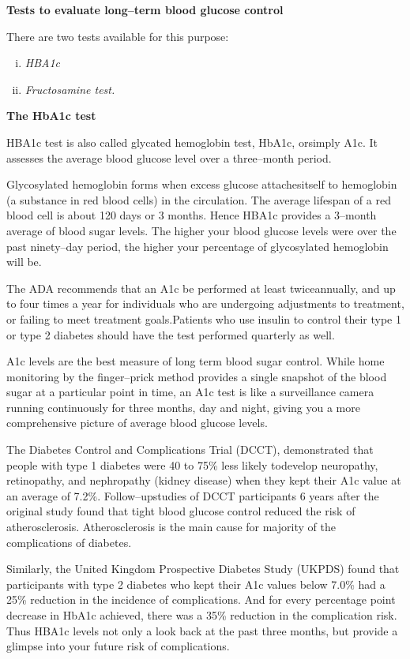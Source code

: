 \noindent\textbf{Tests to evaluate long–term blood glucose control}

\noindent There are two tests available for this purpose:
\begin{enumerate}[i.]
\itemsep=0pt
\item \textit{HBA1c}
\item \textit{Fructosamine test.}
\end{enumerate}

\noindent\textbf{The HbA1c test}

HBA1c test is also called glycated hemoglobin test, HbA1c, or\break simply A1c. It assesses the average blood glucose level over a three–month period.

Glycosylated hemoglobin forms when excess glucose attaches\break itself to hemoglobin (a substance in red blood cells) in the circulation. The average life\-span of a red blood cell is about 120 days or 3 months. Hence HBA1c provides a 3–month average of blood sugar levels. The higher your blood glucose levels were over the past ninety–day period, the higher your percentage of glycosylated hemoglobin will be.

The ADA recommends that an A1c be performed at least twice\break annually, and up to four times a year for individuals who are under\-going adjustments to treatment, or failing to meet treatment goals.\break Patients who use insulin to control their type 1 or type 2 diabetes should have the test performed quarterly as well.

A1c levels are the best measure of long term blood sugar control. While home monitoring by the finger–prick method provides a single snapshot of the blood sugar at a particular point in time, an A1c test is like a surveillance camera running continuously for three months, day and night, giving you a more comprehensive picture of average blood glucose levels.

The Diabetes Control and Complications Trial (DCCT), demonstra\-ted that people with type 1 diabetes were 40 to 75\% less likely to\break develop neuropathy, retinopathy, and nephropathy (kidney di\-sease) when they kept their A1c value at an average of 7.2\%. Follow–up\break studies of DCCT participants 6 years after the original study found that tight blood glucose control reduced the risk of atherosclerosis. Athero\-sclerosis is the main cause for majority of the complications of diabetes.

Similarly, the United Kingdom Prospective Diabetes Study (UKPDS) found that participants with type 2 diabetes who kept their A1c values below 7.0\% had a 25\% reduction in the incidence of complications. And for every percentage point decrease in HbA1c achieved, there was a 35\% reduction in the complication risk. Thus HBA1c levels not only a look back at the past three months, but provide a glimpse into your future risk of complications.

